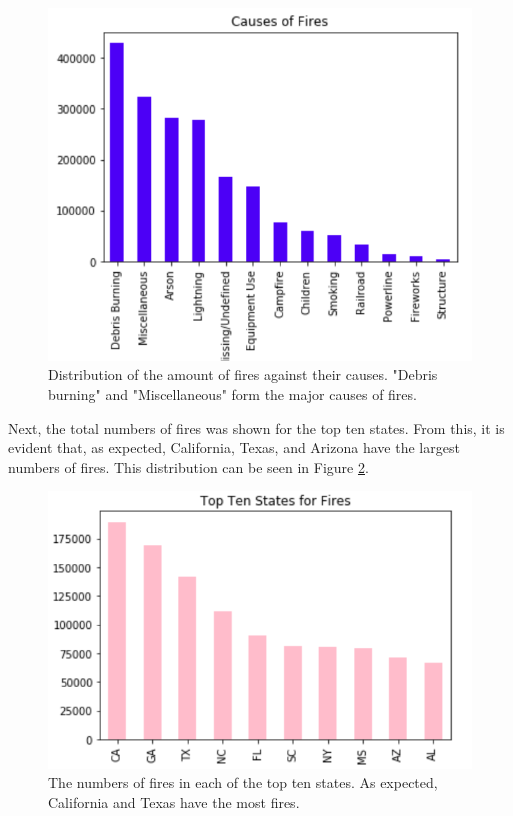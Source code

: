 \documentclass[conference]{IEEEtran}
\begin{document}
\begin{figure}
    \centering
    \includegraphics{img/fire_causes.PNG}
    \caption{Distribution of the amount of fires against their causes. "Debris burning" and "Miscellaneous" form the major causes of fires.}
    \label{fig:fire_causes}
\end{figure}

Next, the total numbers of fires was shown for the top ten states. From this, it is evident that, as expected, California, Texas, and Arizona have the largest numbers of fires. This distribution can be seen in Figure \ref{fig:fire_states}. \par

\begin{figure}
    \centering
    \includegraphics{img/fire_states.PNG}
    \caption{The numbers of fires in each of the top ten states. As expected, California and Texas have the most fires.}
    \label{fig:fire_states}
\end{figure}
\end{document}
